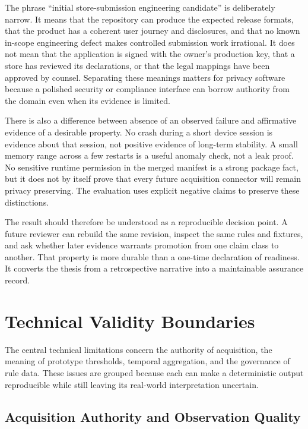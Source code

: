 The phrase ``initial store-submission engineering candidate'' is deliberately narrow. It means that the repository can produce the expected release formats, that the product has a coherent user journey and disclosures, and that no known in-scope engineering defect makes controlled submission work irrational. It does not mean that the application is signed with the owner's production key, that a store has reviewed its declarations, or that the legal mappings have been approved by counsel. Separating these meanings matters for privacy software because a polished security or compliance interface can borrow authority from the domain even when its evidence is limited.

There is also a difference between absence of an observed failure and affirmative evidence of a desirable property. No crash during a short device session is evidence about that session, not positive evidence of long-term stability. A small memory range across a few restarts is a useful anomaly check, not a leak proof. No sensitive runtime permission in the merged manifest is a strong package fact, but it does not by itself prove that every future acquisition connector will remain privacy preserving. The evaluation uses explicit negative claims to preserve these distinctions.

The result should therefore be understood as a reproducible decision point. A future reviewer can rebuild the same revision, inspect the same rules and fixtures, and ask whether later evidence warrants promotion from one claim class to another. That property is more durable than a one-time declaration of readiness. It converts the thesis from a retrospective narrative into a maintainable assurance record.

\section{Technical Validity Boundaries}

The central technical limitations concern the authority of acquisition, the meaning of prototype thresholds, temporal aggregation, and the governance of rule data. These issues are grouped because each can make a deterministic output reproducible while still leaving its real-world interpretation uncertain.

\subsection{Acquisition Authority and Observation Quality}

